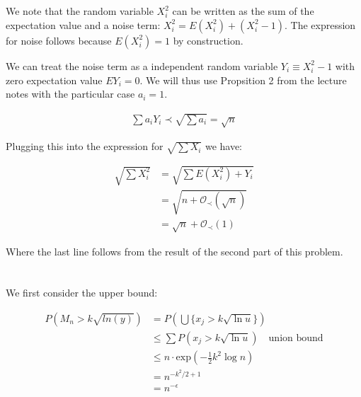 \documentclass{article}
\begin{document}
\subsection{}

We note that the random variable $X_i^2$ can be written as the sum of the expectation value and a noise term: 
$X_i^2 = E \left( X_i^2 \right) + \left( X_i^2 - 1 \right)$. The expression for noise follows because $E \left( X_i^2 \right) = 1$ by construction.

We can treat the noise term as a independent random variable $Y_i\equiv X_i^2 - 1$ with zero expectation value $EY_i=0$. We will thus use Propsition 2 from the lecture notes with the particular case $a_i = 1$.

\begin{equation}
\begin{split}
	\sum{a_iY_i} \prec \sqrt{\sum{a_i}} = \sqrt{n}
\end{split}
\end{equation}

Plugging this into the expression for $\sqrt{\sum{X_i}}$ we have:

\begin{equation}
\begin{split}
	\sqrt{\sum{X_i^2}} &= \sqrt{\sum{E\left(X_i^2\right) + Y_i}}	\\
			   &=\sqrt{n + \mathcal{O}_\prec\left(\sqrt{n}\right)} \\ 
			   &= \sqrt{n}  +\mathcal{O}_\prec \left( 1 \right) 
\end{split}
\end{equation}

Where the last line follows from the result of the second part of this problem.

\section{}

\subsection{}

We first consider the upper bound:

\begin{equation}
	\begin{split}
		P \left( M_n > k\sqrt{ln(y)} \right) &= P \left( \bigcup \{x_j > k\sqrt{\ln{u}}\} \right)\\
						     &\leq \sum{P \left( x_j > k\sqrt{\ln{u}} \right)}\quad \text{union bound} \\
						     &\leq n \cdot \text{exp}\left(- \frac{1}{2} k^2 \log n\right) \\
						     &= n^{-k^2 / 2 + 1} \\
						&= n^{-\epsilon}
	\end{split}
\end{equation}
\end{document}
